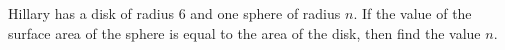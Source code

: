 Hillary has a disk of radius $6$ and one sphere of radius $n$. If the value of the surface area of the sphere is equal to the area of the disk, then find the value $n$.
